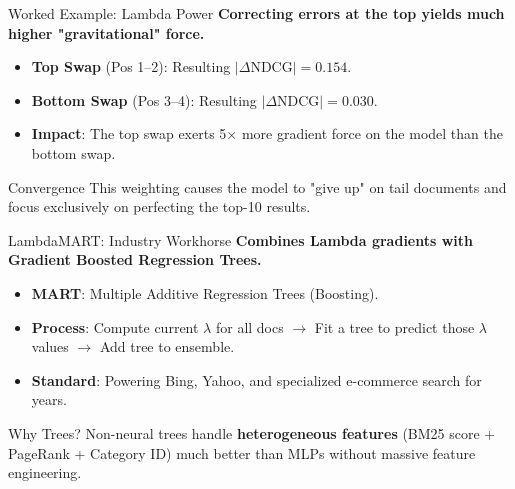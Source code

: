\documentclass[aspectratio=169]{beamer}
\newif\ifanimated
\newcommand{\cpause}{\ifanimated\pause\fi}
\begin{document}
\begin{frame}{Worked Example: Lambda Power}
\textbf{Correcting errors at the top yields much higher "gravitational" force.}

\vspace{0.8em}
\begin{itemize}
    \item \textbf{Top Swap} (Pos 1--2): Resulting $|\Delta\text{NDCG}| = \mathbf{0.154}$.
    \item \textbf{Bottom Swap} (Pos 3--4): Resulting $|\Delta\text{NDCG}| = \mathbf{0.030}$.
    \item \textbf{Impact}: The top swap exerts 5$\times$ more gradient force on the model than the bottom swap.
\end{itemize}\cpause

\vspace{1em}
\cpause
\begin{exampleblock}{Convergence}
This weighting causes the model to "give up" on tail documents and focus exclusively on perfecting the top-10 results.
\end{exampleblock}
\end{frame}

\begin{frame}{LambdaMART: Industry Workhorse}
\textbf{Combines Lambda gradients with Gradient Boosted Regression Trees.}

\vspace{0.8em}
\begin{itemize}
    \item \textbf{MART}: Multiple Additive Regression Trees (Boosting).
    \item \textbf{Process}: Compute current $\lambda$ for all docs $\to$ Fit a tree to predict those $\lambda$ values $\to$ Add tree to ensemble.
    \item \textbf{Standard}: Powering Bing, Yahoo, and specialized e-commerce search for years.
\end{itemize}\cpause

\vspace{1em}
\cpause
\begin{exampleblock}{Why Trees?}
Non-neural trees handle \textbf{heterogeneous features} (BM25 score + PageRank + Category ID) much better than MLPs without massive feature engineering.
\end{exampleblock}
\end{frame}
\end{document}
